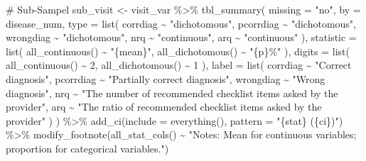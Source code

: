 \documentclass[
  letterpaper,
  DIV=11,
  numbers=noendperiod]{scrartcl}
\newenvironment{Shaded}{\begin{snugshade}}{\end{snugshade}}
\newcommand{\AttributeTok}[1]{\textcolor[rgb]{0.40,0.45,0.13}{#1}}
\newcommand{\CommentTok}[1]{\textcolor[rgb]{0.37,0.37,0.37}{#1}}
\newcommand{\DecValTok}[1]{\textcolor[rgb]{0.68,0.00,0.00}{#1}}
\newcommand{\FunctionTok}[1]{\textcolor[rgb]{0.28,0.35,0.67}{#1}}
\newcommand{\NormalTok}[1]{\textcolor[rgb]{0.00,0.23,0.31}{#1}}
\newcommand{\OtherTok}[1]{\textcolor[rgb]{0.00,0.23,0.31}{#1}}
\newcommand{\SpecialCharTok}[1]{\textcolor[rgb]{0.37,0.37,0.37}{#1}}
\newcommand{\StringTok}[1]{\textcolor[rgb]{0.13,0.47,0.30}{#1}}
\begin{document}
\begin{Shaded}
\begin{Highlighting}[]
\CommentTok{\# Sub{-}Sampel}
\NormalTok{sub\_visit }\OtherTok{\textless{}{-}}\NormalTok{ visit\_var }\SpecialCharTok{\%\textgreater{}\%}
                  \FunctionTok{tbl\_summary}\NormalTok{(}
                    \AttributeTok{missing =} \StringTok{"no"}\NormalTok{, }\AttributeTok{by =}\NormalTok{ disease\_num,}
                    \AttributeTok{type =} \FunctionTok{list}\NormalTok{(}
\NormalTok{                                corrdiag }\SpecialCharTok{\textasciitilde{}} \StringTok{"dichotomous"}\NormalTok{,}
\NormalTok{                                pcorrdiag }\SpecialCharTok{\textasciitilde{}} \StringTok{"dichotomous"}\NormalTok{,}
\NormalTok{                                wrongdiag }\SpecialCharTok{\textasciitilde{}} \StringTok{"dichotomous"}\NormalTok{,}
\NormalTok{                                nrq }\SpecialCharTok{\textasciitilde{}} \StringTok{"continuous"}\NormalTok{,}
\NormalTok{                                arq }\SpecialCharTok{\textasciitilde{}} \StringTok{"continuous"}
\NormalTok{                                ),}
                \AttributeTok{statistic =} \FunctionTok{list}\NormalTok{(}
                                \FunctionTok{all\_continuous}\NormalTok{() }\SpecialCharTok{\textasciitilde{}} \StringTok{"\{mean\}"}\NormalTok{,}
                                \FunctionTok{all\_dichotomous}\NormalTok{() }\SpecialCharTok{\textasciitilde{}} \StringTok{"\{p\}\%"}
\NormalTok{                                ),}
                \AttributeTok{digits =} \FunctionTok{list}\NormalTok{(}
                                \FunctionTok{all\_continuous}\NormalTok{() }\SpecialCharTok{\textasciitilde{}} \DecValTok{2}\NormalTok{,}
                                \FunctionTok{all\_dichotomous}\NormalTok{() }\SpecialCharTok{\textasciitilde{}} \DecValTok{1}
\NormalTok{                              ),}
                \AttributeTok{label =} \FunctionTok{list}\NormalTok{(}
\NormalTok{                                corrdiag }\SpecialCharTok{\textasciitilde{}} \StringTok{"Correct diagnosis"}\NormalTok{,}
\NormalTok{                                pcorrdiag }\SpecialCharTok{\textasciitilde{}} \StringTok{"Partially correct diagnosis"}\NormalTok{,}
\NormalTok{                                wrongdiag }\SpecialCharTok{\textasciitilde{}} \StringTok{"Wrong diagnosis"}\NormalTok{,}
\NormalTok{                                nrq }\SpecialCharTok{\textasciitilde{}} \StringTok{"The number of recommended checklist items asked by the provider"}\NormalTok{,}
\NormalTok{                                arq }\SpecialCharTok{\textasciitilde{}} \StringTok{"The ratio of recommended checklist items asked by the provider"}
\NormalTok{                                )}
\NormalTok{                ) }\SpecialCharTok{\%\textgreater{}\%}
  \FunctionTok{add\_ci}\NormalTok{(}\AttributeTok{include =} \FunctionTok{everything}\NormalTok{(), }\AttributeTok{pattern =} \StringTok{"\{stat\} (\{ci\})"}\NormalTok{) }\SpecialCharTok{\%\textgreater{}\%}
  \FunctionTok{modify\_footnote}\NormalTok{(}\FunctionTok{all\_stat\_cols}\NormalTok{() }\SpecialCharTok{\textasciitilde{}} \StringTok{"Notes: Mean for continuous variables; proportion for categorical variables."}\NormalTok{) }



\end{Highlighting}
\end{Shaded}
\end{document}
